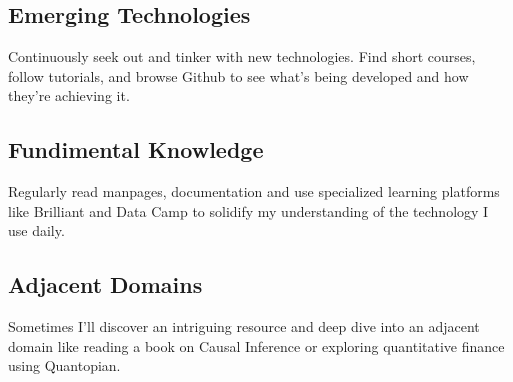 \documentclass[
	10pt, %
]{FreemanCV}
\begin{document}
\begin{paracol}{2}
\subsection{Emerging Technologies}

Continuously seek out and tinker with new technologies. Find short courses, follow tutorials, and browse Github to see what's being developed and how they're achieving it.

\subsection{Fundimental Knowledge}

Regularly read manpages, documentation and use specialized learning platforms like Brilliant and Data Camp to solidify my understanding of the technology I use daily.

\subsection{Adjacent Domains}

Sometimes I'll discover an intriguing resource and deep dive into an adjacent domain like reading a book on Causal Inference or exploring quantitative finance using Quantopian.

\end{paracol} %

\end{document}

